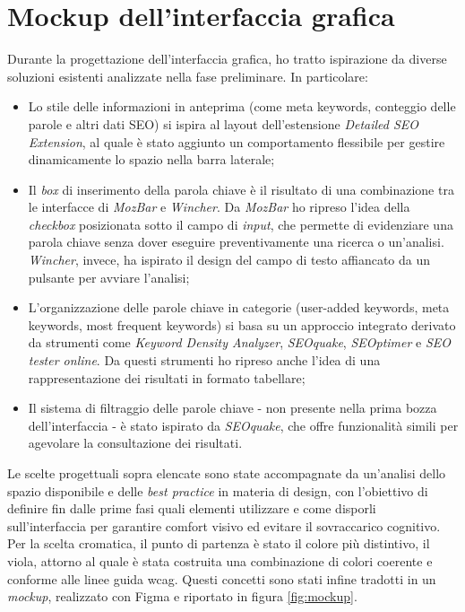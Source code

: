 \section{Mockup dell'interfaccia grafica}
\label{sec:mockup}

Durante la progettazione dell’interfaccia grafica, ho tratto ispirazione da diverse soluzioni esistenti analizzate nella fase preliminare. In particolare:
\begin{itemize}
    \item Lo stile delle informazioni in anteprima (come meta keywords, conteggio delle parole e altri dati SEO) si ispira al layout dell’estensione \textit{Detailed SEO Extension}, al quale è stato aggiunto un comportamento flessibile per gestire dinamicamente lo spazio nella barra laterale;
    \item Il \textit{box} di inserimento della parola chiave è il risultato di una combinazione tra le interfacce di \textit{MozBar} e \textit{Wincher}. Da \textit{MozBar} ho ripreso l’idea della \textit{checkbox} posizionata sotto il campo di \textit{input}, che permette di evidenziare una parola chiave senza dover eseguire preventivamente una ricerca o un’analisi. \textit{Wincher}, invece, ha ispirato il design del campo di testo affiancato da un pulsante per avviare l’analisi;
    \item L’organizzazione delle parole chiave in categorie (user-added keywords, meta keywords, most frequent keywords) si basa su un approccio integrato derivato da strumenti come \textit{Keyword Density Analyzer}, \textit{SEOquake}, \textit{SEOptimer} e \textit{SEO tester online}. Da questi strumenti ho ripreso anche l’idea di una rappresentazione dei risultati in formato tabellare;
    \item Il sistema di filtraggio delle parole chiave - non presente nella prima bozza dell’interfaccia - è stato ispirato da \textit{SEOquake}, che offre funzionalità simili per agevolare la consultazione dei risultati.
\end{itemize}

\vspace{5pt}
\noindent Le scelte progettuali sopra elencate sono state accompagnate da un’analisi dello spazio disponibile e delle \textit{best practice} in materia di design, con l’obiettivo di definire fin dalle prime fasi quali elementi utilizzare e come disporli sull’interfaccia per garantire comfort visivo ed evitare il sovraccarico cognitivo. Per la scelta cromatica, il punto di partenza è stato il colore più distintivo, il viola, attorno al quale è stata costruita una combinazione di colori coerente e conforme alle linee guida \gls{wcag}. Questi concetti sono stati infine tradotti in un \textit{mockup}, realizzato con Figma e riportato in figura \ref{fig:mockup}.

